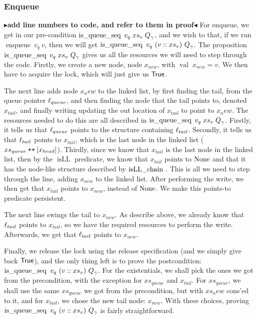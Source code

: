 \documentclass[twoside,11pt,openright]{report}
\newcommand{\enqueue}{\operatorname{enqueue}}
\newcommand{\isqueueseq}{\operatorname{is\_queue\_seq}}
\newcommand{\isLLchain}[1]{\operatorname{isLL\_chain} \; #1}
\newcommand{\isLL}{\operatorname{isLL}}
\newcommand{\nVal}[1]{\operatorname{val} \; #1}
\newcommand\catenate{\mathbin{\text{\ttfamily\upshape ++}}}
\newcommand{\todo}[1]{{\color[rgb]{.5,0,0}\textbf{$\blacktriangleright$#1$\blacktriangleleft$}}}
\begin{document}
\subsubsection{Enqueue}
\todo{add line numbers to code, and refer to them in proof}
For enqueue, we get in our pre-condition $\isqueueseq \; v_q \; xs_v \; Q_\gname$, and we wish to that, if we run $\enqueue\ v_q\ v$, then we will get $\isqueueseq\ v_q\ (v :: xs_v)\ Q_\gname$. The proposition $\isqueueseq \; v_q \; xs_v \; Q_\gname$ gives us all the resources we will need to step through the code.
Firstly, we create a new node, node $x_{new}$, with $\nVal{x_{new}} = v$.
We then have to acquire the lock, which will just give us $\textsf{True}$.

The next line adds node $x_new$ to the linked list, by first finding the tail, from the queue pointer $\ell_{queue}$, and then finding the node that the tail points to, denoted $x_{tail}$, and finally writing updating the out location of $x_{tail}$ to point to $x_new$. The resources needed to do this are all described in $\isqueueseq \; v_q \; xs_v \; Q_\gname$. Firstly, it tells us that $\ell_{queue}$ points to the structure containing $\ell_{tail}$. Secondly, it tells us that $\ell_{tail}$ points to $x_{tail}$, which is the last node in the linked list ($xs_{queue} \catenate [x_{head}]$). Thirdly, since we know that $x_{tail}$ is the last node in the linked list, then by the $\isLL$ predicate, we know that $x_{tail}$ points to $\operatorname{None}$ and that it has the node-like structure described by $\isLLchain$. This is all we need to step through the line, adding $x_{new}$ to the linked list. After performing the write, we then get that $x_{tail}$ points to $x_{new}$, instead of $\operatorname{None}$. We make this points-to predicate persistent.

The next line swings the tail to $x_{new}$. As describe above, we already know that $\ell_{tail}$ points to $x_{tail}$, so we have the required resources to perform the write. Afterwards, we get that $\ell_{tail}$ points to $x_{new}$.

Finally, we release the lock using the release specification (and we simply give back $\textsf{True}$), and the only thing left is to prove the postcondition: $\isqueueseq\ v_q\ (v :: xs_v)\ Q_\gname$. For the existentials, we shall pick the ones we got from the precondition, with the exception for $xs_{queue}$ and $x_{tail}$. For $xs_{queue}$, we shall use the same $xs_{queue}$ we got from the precondition, but with $xs_new$ cons'ed to it, and for $x_{tail}$, we chose the new tail node: $x_{new}$. With these choices, proving $\isqueueseq\ v_q\ (v :: xs_v)\ Q_\gname$ is fairly straightforward.
\end{document}
